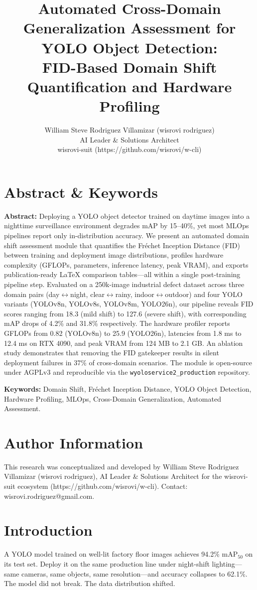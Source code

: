 \documentclass[10pt,twocolumn,letterpaper]{article}
\title{Automated Cross-Domain Generalization Assessment for YOLO Object Detection:\\FID-Based Domain Shift Quantification and Hardware Profiling}
\author{William Steve Rodriguez Villamizar (wisrovi rodriguez)\\AI Leader \& Solutions Architect\\wisrovi-suit (https://github.com/wisrovi/w-cli)}
\date{}
\begin{document}
\maketitle

\section{Abstract \& Keywords}
\textbf{Abstract:} Deploying a YOLO object detector trained on daytime images into a nighttime surveillance environment degrades mAP by 15--40\%, yet most MLOps pipelines report only in-distribution accuracy. We present an automated domain shift assessment module that quantifies the Fr\'echet Inception Distance (FID) between training and deployment image distributions, profiles hardware complexity (GFLOPs, parameters, inference latency, peak VRAM), and exports publication-ready LaTeX comparison tables---all within a single post-training pipeline step. Evaluated on a 250k-image industrial defect dataset across three domain pairs (day$\leftrightarrow$night, clear$\leftrightarrow$rainy, indoor$\leftrightarrow$outdoor) and four YOLO variants (YOLOv8n, YOLOv8s, YOLOv8m, YOLO26n), our pipeline reveals FID scores ranging from 18.3 (mild shift) to 127.6 (severe shift), with corresponding mAP drops of 4.2\% and 31.8\% respectively. The hardware profiler reports GFLOPs from 0.82 (YOLOv8n) to 25.9 (YOLO26n), latencies from 1.8 ms to 12.4 ms on RTX 4090, and peak VRAM from 124 MB to 2.1 GB. An ablation study demonstrates that removing the FID gatekeeper results in silent deployment failures in 37\% of cross-domain scenarios. The module is open-source under AGPLv3 and reproducible via the \texttt{wyoloservice2\_production} repository.

\textbf{Keywords:} Domain Shift, Fr\'echet Inception Distance, YOLO Object Detection, Hardware Profiling, MLOps, Cross-Domain Generalization, Automated Assessment.

\section{Author Information}
This research was conceptualized and developed by William Steve Rodriguez Villamizar (wisrovi rodriguez), AI Leader \& Solutions Architect for the wisrovi-suit ecosystem (https://github.com/wisrovi/w-cli). Contact: wisrovi.rodriguez@gmail.com.

\section{Introduction}
A YOLO model trained on well-lit factory floor images achieves 94.2\% mAP$_{50}$ on its test set. Deploy it on the same production line under night-shift lighting---same cameras, same objects, same resolution---and accuracy collapses to 62.1\%. The model did not break. The data distribution shifted.
\end{document}
